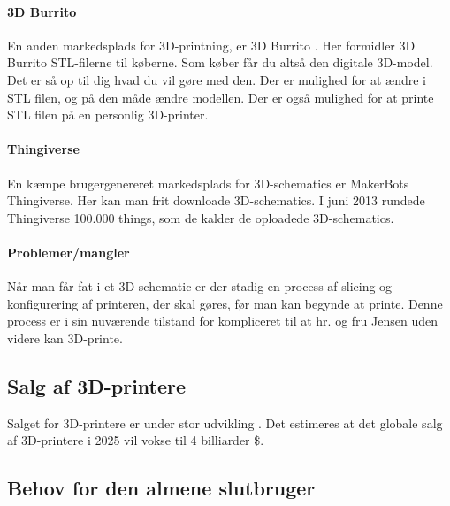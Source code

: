 \paragraph{3D Burrito} %
\label{par:3d_burrito}

En anden markedsplads for 3D-printning, er 3D Burrito \autocite{_3d_2013-1}. Her formidler 3D Burrito STL-filerne til køberne. Som køber får du altså den digitale 3D-model. Det er så op til dig hvad du vil gøre med den. Der er mulighed for at ændre i STL filen, og på den måde ændre modellen. Der er også mulighed for at printe STL filen på en personlig 3D-printer.


\paragraph{Thingiverse} %
\label{par:thingiverse}

En kæmpe brugergenereret markedsplads for 3D-schematics er MakerBots Thingiverse. Her kan man frit downloade 3D-schematics. I juni 2013 rundede Thingiverse 100.000 things, som de kalder de oploadede 3D-schematics. \autocite{_100000th_????}


\paragraph{Problemer/mangler} %
\label{par:problemer_mangler}

Når man får fat i et 3D-schematic er der stadig en process af slicing og konfigurering af printeren, der skal gøres, før man kan begynde at printe. Denne process er i sin nuværende tilstand for kompliceret til at hr. og fru Jensen uden videre kan 3D-printe.



\subsection{Salg af 3D-printere}

Salget for 3D-printere er under stor udvikling \autocite{wohler_sales_2012}. Det estimeres at det globale salg af 3D-printere i 2025 vil vokse til 4 billiarder \$. \autocite[110]{manyika_disruptive_2013}



\subsection{Behov for den almene slutbruger}

